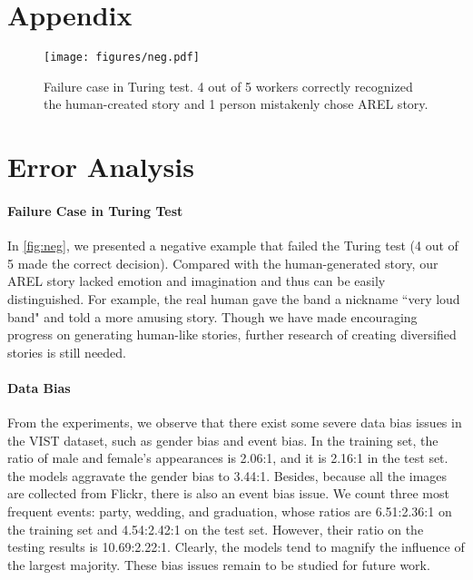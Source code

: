 \documentclass[11pt,a4paper]{article}
\begin{document}





\newpage
\clearpage
\appendix

\section*{Appendix}
\label{sec:supp}

\begin{figure*}
  \begin{center}
  \texttt{[image: figures/neg.pdf]}  
  \end{center}
\caption{Failure case in Turing test. 4 out of 5 workers correctly recognized the human-created story and 1 person mistakenly chose AREL story. 
}
  \label{fig:neg}
\end{figure*}

\section{Error Analysis}
\paragraph{Failure Case in Turing Test}
In \autoref{fig:neg}, we presented a negative example that failed the Turing test (4 out of 5 made the correct decision). Compared with the human-generated story, our AREL story lacked emotion and imagination and thus can be easily distinguished. For example, the real human gave the band a nickname ``very loud band" and told a more amusing story. Though we have made encouraging progress on generating human-like stories, further research of creating diversified stories is still needed.

\paragraph{Data Bias}
From the experiments, we observe that there exist some severe data bias issues in the VIST dataset, such as gender bias and event bias. In the training set, the ratio of male and female's appearances is 2.06:1, and it is 2.16:1 in the test set. the models aggravate the gender bias to 3.44:1. Besides, because all the images are collected from Flickr, there is also an event bias issue. We count three most frequent events: party, wedding, and graduation, whose ratios are 6.51:2.36:1 on the training set and 4.54:2.42:1 on the test set. However, their ratio on the testing results is 10.69:2.22:1. Clearly, the models tend to magnify the influence of the largest majority. These bias issues remain to be studied for future work.
\end{document}
